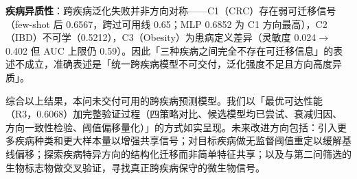 \documentclass{../../latex/templates/mcm-paper}
\begin{document}
\textbf{疾病异质性}：跨疾病泛化失败并非方向对称——C1（CRC）存在弱可迁移信号（few-shot 后 0.6567，跨过可用线 0.65；MLP 0.6852 为 C1 方向最高），C2（IBD）不可学（0.5212），C3（Obesity）为患病定义差异（灵敏度 0.024$\to$0.402 但 AUC 上限仍 0.59）。因此「三种疾病之间完全不存在可迁移信息」的表述不成立，准确表述是「统一跨疾病模型不可交付，泛化强度不足且方向高度异质」。

综合以上结果，本问未交付可用的跨疾病预测模型。我们以「最优可达性能（R3，0.6068）加完整验证过程（四策略对比、候选模型均已尝试、衰减归因、方向一致性检验、阈值偏移量化）」的方式如实呈现。未来改进方向包括：引入更多疾病种类和更大样本量以增强共享信号；对目标疾病做无监督阈值重定以缓解基线偏移；探索疾病特异方向的结构化迁移而非简单特征共享；以及与第二问筛选的生物标志物做交叉验证，寻找真正跨疾病保守的微生物信号。






\nocite{aitchison1986,tibshirani1996,meinshausen2010}
\newpage
\printbibliography[heading=bibintoc,title={参考文献}]

\appendix

\end{document}
